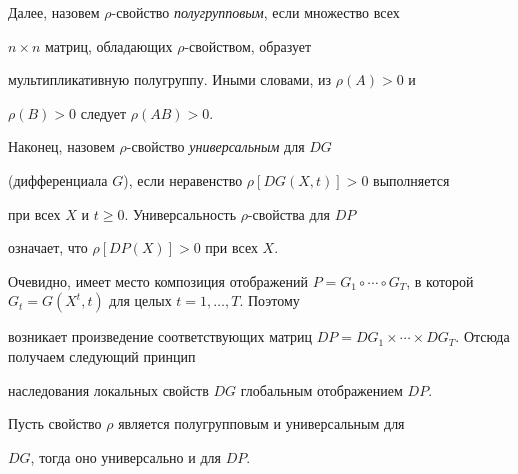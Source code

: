  


Далее, назовем $\rho$-свойство {\it полугрупповым}, если множество всех 


$n\times n$ матриц, обладающих $\rho$-свойством, образует 


мультипликативную полугруппу. Иными словами, из $\rho(A)>0$ и 


$\rho(B)>0$ следует $\rho(A B)>0$. 


 


Наконец, назовем $\rho$-свойство {\it универсальным} для $D G$ 


(дифференциала $G$), если неравенство $\rho[D G(X,t)]>0$ выполняется 


при всех $X$ и $t\ge0$. Универсальность $\rho$-свойства для $D P$ 


означает, что $\rho[D P(X)]>0$ при всех $X$. 


 


Очевидно, имеет место композиция отображений $P=G_1\circ\dotsb\circ 


G_T$, в которой $G_t=G(X^t,t)$ для целых $t=1,\dotsc,T$. Поэтому 


возникает произведение соответствующих матриц $D P=D 


G_1\times\dotsb\times D G_T$. Отсюда получаем следующий принцип 


наследования локальных свойств $D G$ глобальным отображением $D P$. 


 


\begin{thm} 


Пусть свойство $\rho$ является полугрупповым и универсальным для 


$D G$, тогда оно универсально и для $D P$. 


\end{thm} 


 


